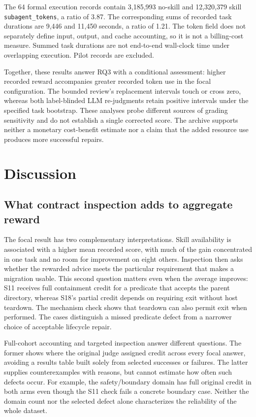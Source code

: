 \documentclass[11pt]{article}
\begin{document}
The 64 formal execution records contain 3,185,993 no-skill and 12,320,379 skill \texttt{subagent\_tokens}, a ratio of 3.87. The corresponding sums of recorded task durations are 9,446 and 11,450 seconds, a ratio of 1.21. The token field does not separately define input, output, and cache accounting, so it is not a billing-cost measure. Summed task durations are not end-to-end wall-clock time under overlapping execution. Pilot records are excluded.

Together, these results answer RQ3 with a conditional assessment: higher recorded reward accompanies greater recorded token use in the focal configuration. The bounded review's replacement intervals touch or cross zero, whereas both label-blinded LLM re-judgments retain positive intervals under the specified task bootstrap. These analyses probe different sources of grading sensitivity and do not establish a single corrected score. The archive supports neither a monetary cost-benefit estimate nor a claim that the added resource use produces more successful repairs.

\section{Discussion}
\subsection{What contract inspection adds to aggregate reward}
The focal result has two complementary interpretations. Skill availability is associated with a higher mean recorded score, with much of the gain concentrated in one task and no room for improvement on eight others. Inspection then asks whether the rewarded advice meets the particular requirement that makes a migration usable. This second question matters even when the average improves: S11 receives full containment credit for a predicate that accepts the parent directory, whereas S18's partial credit depends on requiring exit without host teardown. The mechanism check shows that teardown can also permit exit when performed. The cases distinguish a missed predicate defect from a narrower choice of acceptable lifecycle repair.

Full-cohort accounting and targeted inspection answer different questions. The former shows where the original judge assigned credit across every focal answer, avoiding a results table built solely from selected successes or failures. The latter supplies counterexamples with reasons, but cannot estimate how often such defects occur. For example, the safety/boundary domain has full original credit in both arms even though the S11 check fails a concrete boundary case. Neither the domain count nor the selected defect alone characterizes the reliability of the whole dataset.
\end{document}
